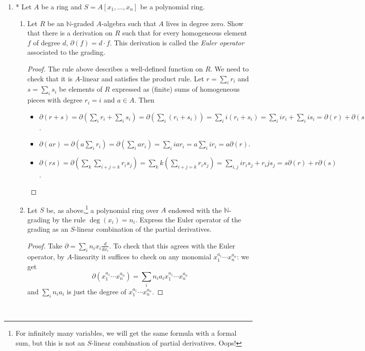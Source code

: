 \documentclass{amsart}[12pt]
\newcommand{\N}{\mathbb{N}}
\numberwithin{equation}{section}
\theoremstyle{plain} %
\theoremstyle{definition}
\theoremstyle{remark}
\newcommand{\red}[1]{{\color{red}#1}}
\begin{document}
\begin{enumerate}
\item* Let $A$ be a ring and $S=A[x_1,\dots,x_n]$ be a polynomial ring.
\begin{enumerate}
\item Let $R$ be an $\N$-graded $A$-algebra such that $A$ lives in degree zero. Show that there is a derivation on $R$ such that for every homogeneous element $f$ of degree $d$, $\partial(f) = d\cdot  f$. This derivation is called the \emph{Euler operator} associated to the grading. 
\begin{proof} The rule above describes a well-defined function on $R$. We need to check that it is $A$-linear and satisfies the product rule.
Let $r=\sum_i r_i$ and $s=\sum_i s_i$ be elements of $R$ expressed as (finite) sums of homogeneous pieces with degree $r_i=i$ and $a\in A$. Then\begin{itemize}
\item $\partial(r+s) = \partial(\sum_i r_i + \sum_i s_i) =  \partial(\sum_i (r_i + s_i) ) = \sum_i i(r_i + s_i) = \sum_i i r_i + \sum_i i s_i = \partial(r) + \partial(s)$.
\item $\partial(ar) = \partial( a \sum_i r_i) = \partial(\sum_i ar_i ) = \sum_i i ar_i = a \sum_i i r_i = a\partial(r)$.
\item $\partial(rs) = \partial(\sum_k \sum_{i+j=k} r_i s_j) = \sum_k k (\sum_{i+j=k} r_i s_j) = \sum_{i,j} i r_i s_j + r_i j s_j = s\partial(r) + r\partial(s)$.\qedhere
\end{itemize}
\end{proof}
\item Let $S$ \red{be, as above,}\footnote{For infinitely many variables, we will get the same formula with a formal sum, but this is not an $S$-linear combination of partial derivatives. Oops!} a polynomial ring over $A$ endowed with the $\N$-grading by the rule $\deg(x_i) = n_i$. Express the Euler operator of the grading as an $S$-linear combination of the partial derivatives.
\begin{proof}
Take $\partial = \sum_i n_i x_i \frac{d}{dx_i}$. To check that this agrees with the Euler operator, by  $A$-linearity it suffices to check on any monomial $x_1^{a_1}\cdots x_n^{a_n}$: we get
\[ \partial(x_1^{a_1}\cdots x_n^{a_n}) = \sum_i n_i a_i x_1^{a_1}\cdots x_n^{a_n}\]
and $\sum_i n_i a_i$ is just the degree of $x_1^{a_1}\cdots x_n^{a_n}$.
\end{proof}
\end{enumerate}

\


\end{enumerate}
\end{document}
